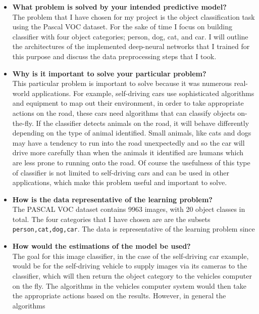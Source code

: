 \documentclass[10pt,a4paper]{article}
\begin{document}
\begin{itemize}
\item {\bf What problem is solved by your intended predictive model?}\\ 
The problem that I have chosen for my project is the object classification task using the Pascal VOC dataset. For the sake of time I focus on building classifier with four object categories; person, dog, cat, and car. I will outline the architectures of the implemented deep-neural networks that I trained for this purpose and discuss the data preprocessing steps that I took.

\item {\bf Why is it important to solve your particular problem?} \\
This particular problem is important to solve because it was numerous real-world applications. For example, self-driving cars use sophisticated algorithms and equipment to map out their environment, in order to take appropriate actions on the road, these cars need algorithms that can classify objects on-the-fly. If the classifier detects animals on the road, it will behave differently depending on the type of animal identified. Small animals, like cats and dogs may have a tendency to run into the road unexpectedly and so the car will drive more carefully than when the animals it identified are humans which are less prone to running onto the road. Of course the usefulness of this type of classifier is not limited to self-driving cars and can be used in other applications, which make this problem useful and important to solve.

\item {\bf How is the data representative of the learning problem?}\\
The PASCAL VOC dataset contains 9963 images, with 20 object classes in total. The four categories that I have chosen are are the subsets \lstinline{person,cat,dog,car}. The data is representative of the learning problem since 

\item {\bf How would the estimations of the model be used?}\\
The goal for this image classifier, in the case of the self-driving car example, would be for the self-driving vehicle to supply images via its cameras to the classifier, which will then return the object category to the vehicles computer on the fly. The algorithms in the vehicles computer system would then take the appropriate actions based on the results. However, in general the algorithms 
\end{itemize}
 
\end{document}
